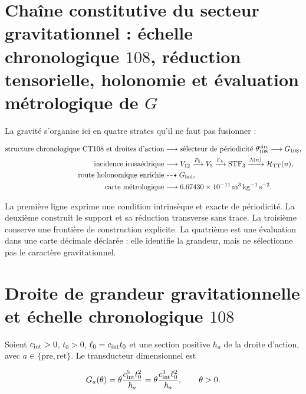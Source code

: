 \label{ch:gravity}

\section{Chaîne constitutive du secteur gravitationnel : échelle chronologique \(108\), réduction tensorielle, holonomie et évaluation métrologique de \(G\)}

La gravité s'organise ici en quatre strates qu'il ne faut pas fusionner :

\begin{equation}
\label{eq:gravity-causal-chain}
\begin{aligned}
\text{structure chronologique CT108 et droites d'action}
&\longrightarrow \text{sélecteur de périodicité }\theta_{108}^{\rm circ}
\longrightarrow G_{108},\\
\text{incidence icosaédrique}
&\longrightarrow V_{12}\xrightarrow{P_5}V_5
\xrightarrow{\Gamma_5}\operatorname{STF}_3
\xrightarrow{\Lambda(n)}\mathcal H_{\rm TT}(n),\\
\text{route holonomique enrichie}
&\dashrightarrow G_{\rm hol},\\
\text{carte métrologique}
&\longrightarrow 6.67430\times10^{-11}\,
\mathrm{m^3\,kg^{-1}\,s^{-2}}.
\end{aligned}
\end{equation}

La première ligne exprime une condition intrinsèque et exacte de
périodicité. La deuxième construit
le support et sa réduction transverse sans trace. La troisième conserve une
frontière de construction explicite. La quatrième est une évaluation dans une
carte décimale déclarée : elle identifie la grandeur, mais ne sélectionne pas le caractère
gravitationnel.

\section{Droite de grandeur gravitationnelle et échelle chronologique \(108\)}

Soient \(c_{\rm int}>0\), \(t_0>0\),
\(\ell_0=c_{\rm int}t_0\) et une section positive
\(\hbar_a\) de la droite d'action, avec
\(a\in\{\mathrm{pre},\mathrm{ret}\}\). Le transducteur dimensionnel est

\begin{equation}
\label{eq:gravity-transducer}
G_a(\theta)
=\theta\frac{c_{\rm int}^{5}t_0^2}{\hbar_a}
=\theta\frac{c_{\rm int}^{3}\ell_0^2}{\hbar_a},
\qquad \theta>0.
\end{equation}


